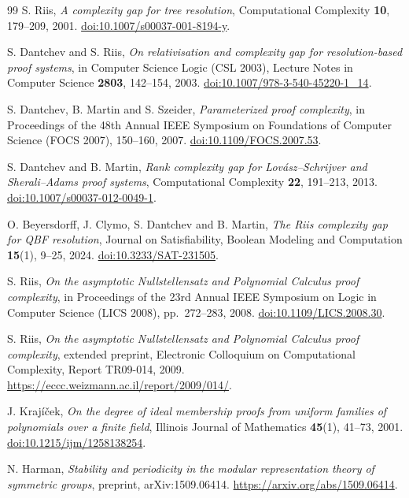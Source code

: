 \clearpage
\begin{thebibliography}{99}
S. Riis, \emph{A complexity gap for tree resolution},
Computational Complexity \textbf{10}, 179--209, 2001.
\href{https://doi.org/10.1007/s00037-001-8194-y}{doi:10.1007/s00037-001-8194-y}.

S. Dantchev and S. Riis, \emph{On relativisation and complexity gap for
resolution-based proof systems}, in Computer Science Logic (CSL 2003),
Lecture Notes in Computer Science \textbf{2803}, 142--154, 2003.
\href{https://doi.org/10.1007/978-3-540-45220-1_14}{doi:10.1007/978-3-540-45220-1\_14}.

S. Dantchev, B. Martin and S. Szeider, \emph{Parameterized proof complexity},
in Proceedings of the 48th Annual IEEE Symposium on Foundations of Computer Science
(FOCS 2007), 150--160, 2007.
\href{https://doi.org/10.1109/FOCS.2007.53}{doi:10.1109/FOCS.2007.53}.

S. Dantchev and B. Martin, \emph{Rank complexity gap for Lov\'asz--Schrijver
and Sherali--Adams proof systems}, Computational Complexity \textbf{22},
191--213, 2013.
\href{https://doi.org/10.1007/s00037-012-0049-1}{doi:10.1007/s00037-012-0049-1}.

O. Beyersdorff, J. Clymo, S. Dantchev and B. Martin, \emph{The Riis complexity
gap for QBF resolution}, Journal on Satisfiability, Boolean Modeling and
Computation \textbf{15}(1), 9--25, 2024.
\href{https://doi.org/10.3233/SAT-231505}{doi:10.3233/SAT-231505}.

S. Riis, \emph{On the asymptotic Nullstellensatz and Polynomial Calculus proof complexity}, in
Proceedings of the 23rd Annual IEEE Symposium on Logic in Computer Science
(LICS 2008), pp.~272--283, 2008.
\href{https://doi.org/10.1109/LICS.2008.30}{doi:10.1109/LICS.2008.30}.

S. Riis, \emph{On the asymptotic Nullstellensatz and Polynomial Calculus proof complexity}, extended preprint,
Electronic Colloquium on Computational Complexity, Report TR09-014, 2009.
\url{https://eccc.weizmann.ac.il/report/2009/014/}.

J. Kraj\'i\v cek, \emph{On the degree of ideal membership proofs from uniform
families of polynomials over a finite field}, Illinois Journal of
Mathematics \textbf{45}(1), 41--73, 2001.
\href{https://doi.org/10.1215/ijm/1258138254}{doi:10.1215/ijm/1258138254}.

N. Harman, \emph{Stability and periodicity in the modular representation
theory of symmetric groups}, preprint, arXiv:1509.06414.
\url{https://arxiv.org/abs/1509.06414}.


\end{thebibliography}

